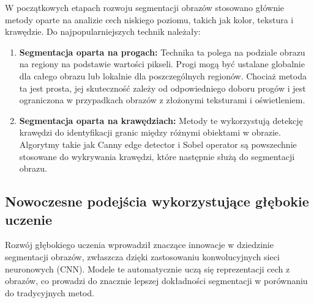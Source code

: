 W początkowych etapach rozwoju segmentacji obrazów stosowano głównie metody oparte na analizie 
cech niskiego poziomu, takich jak kolor, tekstura i krawędzie. Do najpopularniejszych technik należały:

\begin{enumerate}
    \item \textbf{Segmentacja oparta na progach:} Technika ta polega na podziale obrazu na regiony 
    na podstawie wartości pikseli. Progi mogą być ustalane globalnie dla całego obrazu lub lokalnie 
    dla poszczególnych regionów. Chociaż metoda ta jest prosta, jej skuteczność zależy od 
    odpowiedniego doboru progów i jest ograniczona w przypadkach obrazów z złożonymi teksturami i 
    oświetleniem. \cite{seg_tres}
    \item \textbf{Segmentacja oparta na krawędziach:} Metody te wykorzystują detekcję krawędzi 
    do identyfikacji granic między różnymi obiektami w obrazie. Algorytmy takie jak Canny edge 
    detector i Sobel operator są powszechnie stosowane do wykrywania krawędzi, które następnie 
    służą do segmentacji obrazu. \cite{edge_seg}
\end{enumerate}

\subsection*{Nowoczesne podejścia wykorzystujące głębokie uczenie}

Rozwój głębokiego uczenia wprowadził znaczące innowacje w dziedzinie segmentacji obrazów, 
zwłaszcza dzięki zastosowaniu konwolucyjnych sieci neuronowych (CNN). Modele te automatycznie 
uczą się reprezentacji cech z obrazów, co prowadzi do znacznie lepszej dokładności segmentacji w 
porównaniu do tradycyjnych metod. \cite{deep_seg}

